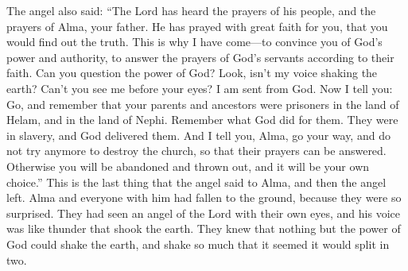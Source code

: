 The angel also said: ``The Lord has heard the prayers of his people, and the prayers of Alma, your father. He has prayed with great faith for you, that you would find out the truth. This is why I have come---to convince you of God's power and authority, to answer the prayers of God's servants according to their faith.
\bverse \iffalse And now behold, can ye dispute the power of God? For behold, doth not my voice shake the earth? And can ye not also behold me before you? And I am sent from God. \fi
Can you question the power of God? Look, isn't my voice shaking the earth? Can't you see me before your eyes? I am sent from God.
\bverse \iffalse Now I say unto thee: Go, and remember the captivity of thy fathers in the land of Helam, and in the land of Nephi; and remember how great things he has done for them; for they were in bondage, and he has delivered them. And now I say unto thee, Alma, go thy way, and seek to destroy the church no more, that their prayers may be answered, and this even if thou wilt of thyself be cast off. \fi
Now I tell you: Go, and remember that your parents and ancestors were prisoners in the land of Helam, and in the land of Nephi. Remember what God did for them. They were in slavery, and God delivered them. And I tell you, Alma, go your way, and do not try anymore to destroy the church, so that their prayers can be answered. Otherwise you will be abandoned and thrown out, and it will be your own choice.''
\bverse \iffalse And now it came to pass that these were the last words which the angel spake unto Alma, and he departed. \fi
This is the last thing that the angel said to Alma, and then the angel left.
\bverse \iffalse And now Alma and those that were with him fell again to the earth, for great was their astonishment; for with their own eyes they had beheld an angel of the Lord; and his voice was as thunder, which shook the earth; and they knew that there was nothing save the power of God that could shake the earth and cause it to tremble as though it would part asunder. \fi
Alma and everyone with him had fallen to the ground, because they were so surprised. They had seen an angel of the Lord with their own eyes, and his voice was like thunder that shook the earth. They knew that nothing but the power of God could shake the earth, and shake so much that it seemed it would split in two.
\bverse \iffalse And now the astonishment of Alma was so great that he became dumb, that he could not open his mouth; yea, and he became weak, even that he could not move his hands; therefore he was taken by those that were with him, and carried helpless, even until he was laid before his father. \fi

